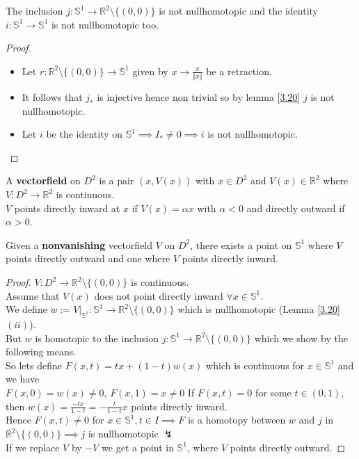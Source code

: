 \begin{corollary}\label{3.21}
    The inclusion $j:\mathbb{S}^1\to\mathbb{R}^2\setminus\{(0,0)\}$ is not nullhomotopic and the identity $i:\mathbb{S}^1\to\mathbb{S}^1$ is not nullhomotopic too.
\end{corollary}
\begin{proof}
    \begin{itemize}
        \item Let $r:\mathbb{R}^2\setminus\{(0,0)\}\to\mathbb{S}^1$ given by $x\to \frac{x}{\Vert x\Vert}$ be a retraction.\\
        \item It follows that $j_*$ is injective hence non trivial so by lemma \ref{3.20} $j$ is not nullhomotopic.
        \item Let $i$ be the identity on $\mathbb{S}^1\implies I_*\neq 0\implies i$ is not nullhomotopic.
    \end{itemize}
\end{proof}
\begin{definition}\label{3.22}
    A \textbf{vectorfield} on $D^2$ is a pair $(x,V(x))$ with $x\in D^2$ and $V(x)\in \mathbb{R}^2$ where $V:D^2\to\mathbb{R}^2$ is continuous.\\
    $V$ points directly inward at $x$ if $V(x)=\alpha x$ with $\alpha<0$ and directly outward if $\alpha>0$. 
\end{definition}
\begin{theorem}\label{3.23}
    Given a \textbf{nonvanishing} vectorfield $V$ on $D^2$, there exists a point on $\mathbb{S}^1$ where $V$ points directly outward and one where $V$ points directly inward.
\end{theorem}
\begin{proof}
    $V:D^2\to\mathbb{R}^2\setminus\{(0,0)\}$ is continuous.\\
    Assume that $V(x)$ does not point directly inward $\forall x\in \mathbb{S}^1$.\\
    We define $w:=V|_{\mathbb{S}^1}:\mathbb{S}^1\to\mathbb{R}^2\setminus\{(0,0)\}$ which is nullhomotopic (Lemma \ref{3.20} $(ii)$).\\
    But $w$ is homotopic to the inclusion $j:\mathbb{S}^1\to\mathbb{R}^2\setminus\{(0,0)\}$ which we show by the following means.\\
    So lets define $F(x,t)=tx+(1-t)w(x)$ which is continuous for $x\in \mathbb{S}^1$ and we have \\
    $F(x,0)=w(x)\neq 0$, $F(x,1)=x\neq 0$
    If $F(x,t)=0$ for some $t\in(0,1)$,\\
    then $w(x)=\frac{-tx}{1-t}=-\frac{t}{1-t}x$ points directly inward. \\
    Hence $F(x,t)\neq 0$ for $x\in\mathbb{S}^1,t\in I\implies F$ 
    is a homotopy between $w$ and $j$ in $\mathbb{R}^2\setminus\{(0,0)\}\implies j$ is nullhomotopic $\lightning$\\
    If we replace $V$ by $-V$ we get a point in $\mathbb{S}^1$, where $V$ points directly outward.
\end{proof}
